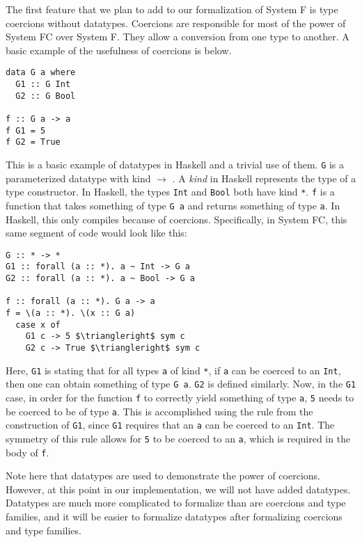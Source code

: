 \documentclass{sig-alternate}
\begin{document}
The first feature that we plan to add to our formalization of System F is type coercions without datatypes.  Coercions are responsible for most of the power of System FC over System F. They allow a conversion from one type to another. A basic example of the usefulness of coercions is below.
\begin{verbatim}
data G a where
  G1 :: G Int
  G2 :: G Bool

f :: G a -> a
f G1 = 5
f G2 = True
\end{verbatim}
This is a basic example of datatypes in Haskell and a trivial use of them. \texttt{G} is a parameterized datatype with kind {\tt *} $\rightarrow$ {\tt *}. A \textit{kind} in Haskell represents the type of a type constructor. In Haskell, the types \texttt{Int} and \texttt{Bool} both have kind \texttt{*}. \texttt{f} is a function that takes something of type \texttt{G a} and returns something of type \texttt{a}. In Haskell, this only compiles because of coercions. Specifically, in System FC, this same segment of code would look like this:
\begin{lstlisting}
G :: * -> *
G1 :: forall (a :: *). a ~ Int -> G a
G2 :: forall (a :: *). a ~ Bool -> G a

f :: forall (a :: *). G a -> a
f = \(a :: *). \(x :: G a)
  case x of
    G1 c -> 5 $\triangleright$ sym c
    G2 c -> True $\triangleright$ sym c
\end{lstlisting}
Here, \texttt{G1} is stating that for all types \texttt{a} of kind \texttt{*}, if \texttt{a} can be coerced to an \texttt{Int}, then one can obtain something of type \texttt{G a}. \texttt{G2} is defined similarly. Now, in the \texttt{G1} case, in order for the function \texttt{f} to correctly yield something of type \texttt{a}, \texttt{5} needs to be coerced to be of type \texttt{a}. This is accomplished using the rule from the construction of \texttt{G1}, since \texttt{G1} requires that an \texttt{a} can be coerced to an \texttt{Int}. The symmetry of this rule allows for \texttt{5} to be coerced to an \texttt{a}, which is required in the body of \texttt{f}. 

Note here that datatypes are used to demonstrate the power of coercions. However, at this point in our implementation, we will not have added datatypes. Datatypes are much more complicated to formalize than are coercions and type families, and it will be easier to formalize datatypes after formalizing coercions and type families.

\end{document}
